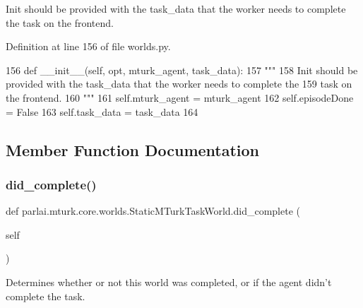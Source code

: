 \begin{DoxyVerb}Init should be provided with the task_data that the worker needs to complete the
task on the frontend.
\end{DoxyVerb}
 

Definition at line 156 of file worlds.\+py.


\begin{DoxyCode}
156     \textcolor{keyword}{def }\_\_init\_\_(self, opt, mturk\_agent, task\_data):
157         \textcolor{stringliteral}{"""}
158 \textcolor{stringliteral}{        Init should be provided with the task\_data that the worker needs to complete the}
159 \textcolor{stringliteral}{        task on the frontend.}
160 \textcolor{stringliteral}{        """}
161         self.mturk\_agent = mturk\_agent
162         self.episodeDone = \textcolor{keyword}{False}
163         self.task\_data = task\_data
164 
\end{DoxyCode}


\subsection{Member Function Documentation}
\mbox{\label{classparlai_1_1mturk_1_1core_1_1worlds_1_1StaticMTurkTaskWorld_a2711944f83104bc843ff81293674c6ab}} 
\subsubsection{\texorpdfstring{did\+\_\+complete()}{did\_complete()}}
{\footnotesize\ttfamily def parlai.\+mturk.\+core.\+worlds.\+Static\+M\+Turk\+Task\+World.\+did\+\_\+complete (\begin{DoxyParamCaption}\item[{}]{self }\end{DoxyParamCaption})}

\begin{DoxyVerb}Determines whether or not this world was completed, or if the agent didn't
complete the task.
\end{DoxyVerb}
 

